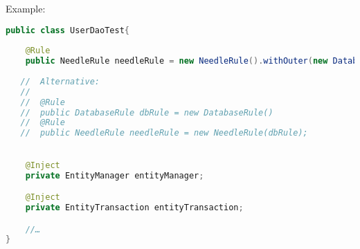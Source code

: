 Example:

\begin{lstlisting}[language={JAVA},caption=Injectable database resources]
public class UserDaoTest{
    
    @Rule
    public NeedleRule needleRule = new NeedleRule().withOuter(new DatabaseRule());
    
   //  Alternative:
   // 
   //  @Rule
   //  public DatabaseRule dbRule = new DatabaseRule()
   //  @Rule
   //  public NeedleRule needleRule = new NeedleRule(dbRule);
   

    @Inject
    private EntityManager entityManager;

    @Inject
    private EntityTransaction entityTransaction;

    //…
}
\end{lstlisting}
